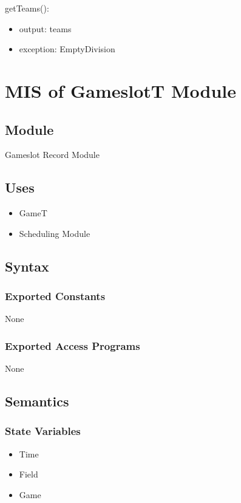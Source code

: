 \documentclass[12pt, titlepage]{article}
\begin{document}
\noindent getTeams():
\begin{itemize}
  \item output: teams
  \item exception: EmptyDivision
\end{itemize}

\newpage

\section{MIS of GameslotT Module} \label{GameslotT}

\subsection{Module}

Gameslot Record Module

\subsection{Uses}
\begin{itemize}
  \item GameT
  \item Scheduling Module
\end{itemize}

\subsection{Syntax}

\subsubsection{Exported Constants}
None

\subsubsection{Exported Access Programs}
None

\subsection{Semantics}

\subsubsection{State Variables}
\begin{itemize}
  \item Time
  \item Field
  \item Game
\end{itemize}
\end{document}
